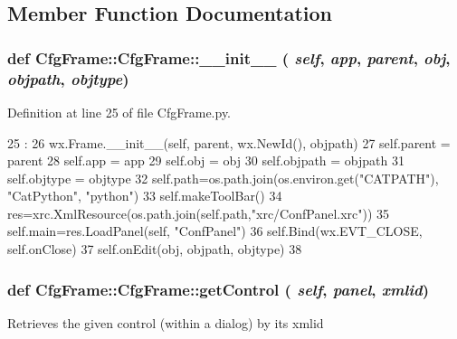 \subsection{Member Function Documentation}
\hypertarget{classCfgFrame_1_1CfgFrame_ade76b3c75ebbea57217775c9849493b2}{
\subsubsection[{\_\-\_\-init\_\-\_\-}]{\setlength{\rightskip}{0pt plus 5cm}def CfgFrame::CfgFrame::\_\-\_\-init\_\-\_\- ( {\em self}, \/   {\em app}, \/   {\em parent}, \/   {\em obj}, \/   {\em objpath}, \/   {\em objtype})}}
\label{classCfgFrame_1_1CfgFrame_ade76b3c75ebbea57217775c9849493b2}


Definition at line 25 of file CfgFrame.py.


\begin{DoxyCode}
25                                                            : 
26         wx.Frame.__init__(self, parent, wx.NewId(), objpath)
27         self.parent  = parent
28         self.app     = app
29         self.obj     = obj
30         self.objpath = objpath
31         self.objtype = objtype
32         self.path=os.path.join(os.environ.get("CATPATH"), "CatPython", "python")
33         self.makeToolBar()
34         res=xrc.XmlResource(os.path.join(self.path,"xrc/ConfPanel.xrc"))
35         self.main=res.LoadPanel(self, "ConfPanel")                
36         self.Bind(wx.EVT_CLOSE, self.onClose)
37         self.onEdit(obj, objpath, objtype)
38         
\end{DoxyCode}
\hypertarget{classCfgFrame_1_1CfgFrame_a1a170349dd0f885911c6a5dc05f0568b}{
\subsubsection[{getControl}]{\setlength{\rightskip}{0pt plus 5cm}def CfgFrame::CfgFrame::getControl ( {\em self}, \/   {\em panel}, \/   {\em xmlid})}}
\label{classCfgFrame_1_1CfgFrame_a1a170349dd0f885911c6a5dc05f0568b}
\begin{DoxyVerb}Retrieves the given control (within a dialog) by its xmlid\end{DoxyVerb}
 

